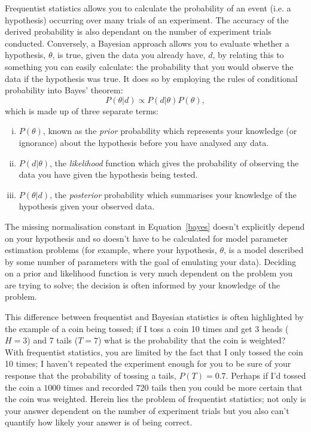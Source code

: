 Frequentist statistics allows you to calculate the probability of an event (i.e. a hypothesis) occurring over many trials of an experiment. The accuracy of the derived probability is also dependant on the number of experiment trials conducted. Conversely, a Bayesian approach allows you to evaluate whether a hypothesis, $\theta$, is true, given the data you already have, $d$, by relating this to something you can easily calculate: the probability that you would observe the data if the hypothesis was true. It does so by employing the rules of conditional probability into Bayes' theorem:
\begin{equation}\label{bayes}
P(\theta|d) \propto P(d | \theta)P(\theta),
\end{equation}
which is made up of three separate terms: 
\begin{enumerate}[(i)]
\item $P(\theta)$, known as the \emph{prior} probability which represents your knowledge (or ignorance) about the hypothesis before you have analysed any data. 
\item $P(d  | \theta)$, the \emph{likelihood} function which gives the probability of observing the data you have given the hypothesis being tested. 
\item $P(\theta | d)$, the \emph{posterior} probability which summarises your knowledge of the hypothesis given your observed data.
\end{enumerate}
The missing normalisation constant in Equation~\ref{bayes} doesn't explicitly depend on your hypothesis and so doesn't have to be calculated for model parameter estimation problems (for example, where your hypothesis, $\theta$, is a model described by some number of parameters with the goal of emulating your data). Deciding on a prior and likelihood function is very much dependent on the problem you are trying to solve; the decision is often informed by your knowledge of the problem. 

This difference between frequentist and Bayesian statistics is often highlighted by the example of a coin being tossed; if I toss a coin 10 times and get 3 heads ($H=3$) and 7 tails ($T=7$) what is the probability that the coin is weighted? With frequentist statistics, you are limited by the fact that I only tossed the coin 10 times; I haven't repeated the experiment enough for you to be sure of your response that the probability of tossing a tails,  $P(T)=0.7$. Perhaps if I'd tossed the coin a $1000$ times and recorded $720$ tails then you could be more certain that the coin was weighted. Herein lies the problem of frequentist statistics; not only is your answer dependent on the number of experiment trials but you also can't quantify how likely your answer is of being correct. 

